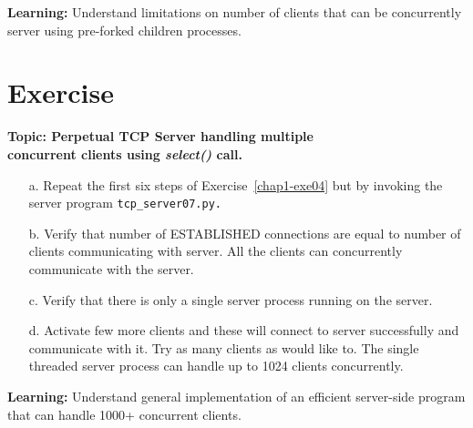 \begin{multicols}{2}
\vspace{-.3cm}

\textbf{Learning:} Understand limitations on number of clients that can be concurrently server using pre-forked children processes.

\vspace{-.3cm}

\section*{Exercise \label{chap1-exe05}}

\textbf{Topic: Perpetual TCP Server handling multiple\\ concurrent clients using \textit{select()} call.}

\vspace{-.3cm}

\begin{itemize}

\item[a.] Repeat the first six steps of Exercise~\ref{chap1-exe04} but by invoking the server program \texttt{tcp\_server07.py.}

\item[b.] Verify that number of ESTABLISHED connections are equal to number of clients communicating with server. All the clients can concurrently communicate with the server.

\item[c.] Verify that there is only a single server process running on the server.

\item[d.] Activate few more clients and these will connect to server successfully and communicate with it. Try as many clients as would like to. The single threaded server process can handle up to 1024 clients concurrently.

\end{itemize}

\vspace{-.3cm}

\textbf{Learning:}  Understand general implementation of an efficient server-side program that can handle 1000+ concurrent clients.

\vspace{-.3cm}


\end{multicols}
